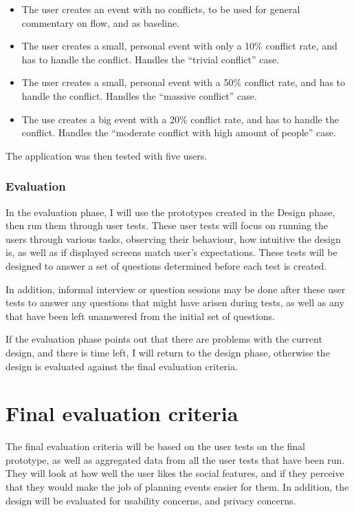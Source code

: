 \documentclass[]{report}
\begin{document}
\begin{itemize}
\item The user creates an event with no conflicts, to be used for general
  commentary on flow, and as baseline.
\item The user creates a small, personal event with only a 10\% conflict rate,
  and has to handle the conflict. Handles the ``trivial conflict'' case.
\item The user creates a small, personal event with a 50\% conflict rate, and
  has to handle the conflict. Handles the ``massive conflict'' case.
\item The use creates a big event with a 20\% conflict rate, and has to handle
  the conflict. Handles the ``moderate conflict with high amount of people''
  case.
\end{itemize}

The application was then tested with five users.

\subsubsection{Evaluation}

In the evaluation phase, I will use the prototypes created in the Design phase,
then run them through user tests. These user tests will focus on running the
users through various tasks, observing their behaviour, how intuitive the
design is, as well as if displayed screens match user's expectations. These
tests will be designed to answer a set of questions determined before each test
is created.

In addition, informal interview or question sessions may be done after these
user tests to answer any questions that might have arisen during tests, as well
as any that have been left unanswered from the initial set of questions.

If the evaluation phase points out that there are problems with the current
design, and there is time left, I will return to the design phase, otherwise the
design is evaluated against the final evaluation criteria.

\section{Final evaluation criteria}

The final evaluation criteria will be based on the user tests on the final
prototype, as well as aggregated data from all the user tests that have been
run. They will look at how well the user likes the social features, and if they
perceive that they would make the job of planning events easier for them. In
addition, the design will be evaluated for usability concerns, and privacy
concerns.
\end{document}
